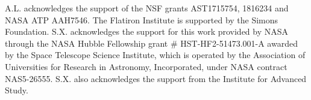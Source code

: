 \documentclass[preprint2,twocolumn,times,tighten]{aastex63}
\begin{document}
{%
    















 







    

 

\acknowledgments
 A.L. acknowledges the support of the NSF grants AST1715754, 1816234 and NASA ATP AAH7546.   The  Flatiron  Institute  is supported by the Simons Foundation.
S.X. acknowledges the support for 
this work provided by NASA through the NASA Hubble Fellowship grant \# HST-HF2-51473.001-A awarded by the Space Telescope Science Institute, which is operated by the Association of Universities for Research in Astronomy, Incorporated, under NASA contract NAS5-26555. 
S.X. also acknowledges the support from the Institute for Advanced Study.


}
\end{document}
